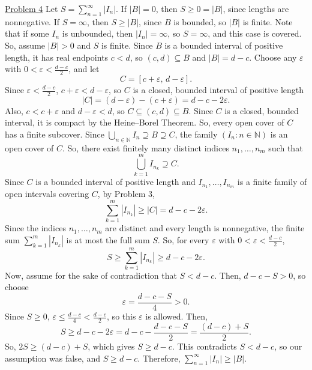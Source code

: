 \documentclass{exam}
\begin{document}
\underline{Problem 4}
\newline
\newline
Let $S=\sum_{n=1}^{\infty}|I_n|$. If $|B|=0$, then $S\geq 0=|B|$, since lengths are nonnegative. If $S=\infty$, then $S\geq|B|$, since $B$ is bounded, so $|B|$ is finite. Note that if some $I_n$ is unbounded, then $|I_n|=\infty$, so $S=\infty$, and this case is covered. So, assume $|B|>0$ and $S$ is finite.
\newline
\newline
Since $B$ is a bounded interval of positive length, it has real endpoints $c<d$, so $(c,d)\subseteq B$ and $|B|=d-c$. Choose any $\varepsilon$ with $0<\varepsilon<\frac{d-c}{2}$, and let
\[
    C=[c+\varepsilon,\,d-\varepsilon].
\]
Since $\varepsilon<\frac{d-c}{2}$, $c+\varepsilon<d-\varepsilon$, so $C$ is a closed, bounded interval of positive length
\[
    |C|=(d-\varepsilon)-(c+\varepsilon)=d-c-2\varepsilon.
\]
Also, $c<c+\varepsilon$ and $d-\varepsilon<d$, so $C\subseteq(c,d)\subseteq B$.
\newline
\newline
Since $C$ is a closed, bounded interval, it is compact by the Heine--Borel Theorem. So, every open cover of $C$ has a finite subcover. Since $\bigcup_{n\in\mathbb{N}}I_n\supseteq B\supseteq C$, the family $(I_n:n\in\mathbb{N})$ is an open cover of $C$. So, there exist finitely many distinct indices $n_1,\ldots,n_m$ such that
\[
    \bigcup_{k=1}^{m}I_{n_k}\supseteq C.
\]
Since $C$ is a bounded interval of positive length and $I_{n_1},\ldots,I_{n_m}$ is a finite family of open intervals covering $C$, by Problem 3,
\[
    \sum_{k=1}^{m}|I_{n_k}|\geq|C|=d-c-2\varepsilon.
\]
Since the indices $n_1,\ldots,n_m$ are distinct and every length is nonnegative, the finite sum $\sum_{k=1}^{m}|I_{n_k}|$ is at most the full sum $S$. So, for every $\varepsilon$ with $0<\varepsilon<\frac{d-c}{2}$,
\[
    S\geq\sum_{k=1}^{m}|I_{n_k}|\geq d-c-2\varepsilon.
\]
Now, assume for the sake of contradiction that $S<d-c$. Then, $d-c-S>0$, so choose
\[
    \varepsilon=\frac{d-c-S}{4}>0.
\]
Since $S\geq 0$, $\varepsilon\leq\frac{d-c}{4}<\frac{d-c}{2}$, so this $\varepsilon$ is allowed. Then,
\[
    S\geq d-c-2\varepsilon=d-c-\frac{d-c-S}{2}=\frac{(d-c)+S}{2}.
\]
So, $2S\geq(d-c)+S$, which gives $S\geq d-c$. This contradicts $S<d-c$, so our assumption was false, and $S\geq d-c$.
\newline
\newline
Therefore, $\sum_{n=1}^{\infty}|I_n|\geq|B|$.
\end{document}
